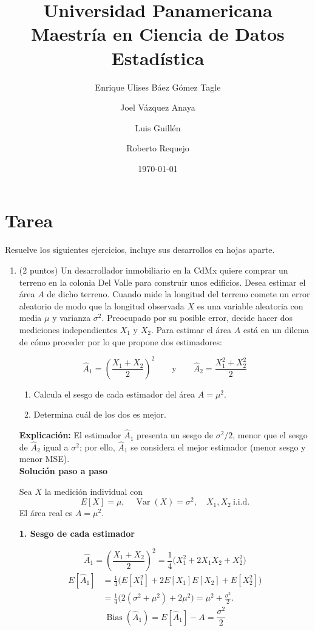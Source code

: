 \documentclass[12pt]{article}
\title{Universidad Panamericana \\ Maestría en Ciencia de Datos \\ Estadística}
\date{\today}
\author{Enrique Ulises Báez Gómez Tagle \and Joel Vázquez Anaya \and Luis Guillén \and Roberto Requejo}
\begin{document}
\maketitle

\section*{Tarea}

Resuelve los siguientes ejercicios, incluye sus desarrollos en hojas aparte.

\begin{enumerate}
	\item (2 puntos) Un desarrollador inmobiliario en la CdMx quiere comprar un terreno en la colonia Del Valle para construir unos edificios. Desea estimar el área $A$ de dicho terreno. Cuando mide la longitud del terreno comete un error aleatorio de modo que la longitud observada $X$ es una variable aleatoria con media $\mu$ y varianza $\sigma^2$. Preocupado por su posible error, decide hacer dos mediciones independientes $X_1$ y $X_2$. Para estimar el área $A$ está en un dilema de cómo proceder por lo que propone dos estimadores:

	      \[
		      \hat{A}_1 = \left( \frac{X_1 + X_2}{2} \right)^2 \qquad \text{y} \qquad \hat{A}_2 = \frac{X_1^2 + X_2^2}{2}
	      \]

	      \begin{enumerate}
		      \item Calcula el sesgo de cada estimador del área $A = \mu^2$.
		      \item Determina cuál de los dos es mejor.
	      \end{enumerate}
	      \textbf{Explicación:} El estimador \(\hat{A}_1\) presenta un sesgo de \(\sigma^2/2\), menor que el sesgo de \(\hat{A}_2\) igual a \(\sigma^2\); por ello, \(\hat{A}_1\) se considera el mejor estimador (menor sesgo y menor MSE).
\\[1em]
\textbf{Solución paso a paso}

Sea \(X\) la medición individual con
\[
E[X]=\mu,\quad \operatorname{Var}(X)=\sigma^{2},\quad X_1,X_2\ \text{i.i.d.}
\]
El área real es \(A=\mu^{2}\).

\medskip
\textbf{1. Sesgo de cada estimador}

\[
\hat A_{1}= \left(\frac{X_{1}+X_{2}}{2}\right)^{2}
= \frac{1}{4}\bigl(X_{1}^{2}+2X_{1}X_{2}+X_{2}^{2}\bigr)
\]
\begin{align*}
E[\hat A_{1}]
&=\frac{1}{4}\bigl(E[X_{1}^{2}]+2E[X_{1}]E[X_{2}]+E[X_{2}^{2}]\bigr)\\
&=\frac{1}{4}\bigl(2(\sigma^{2}+\mu^{2})+2\mu^{2}\bigr)
=\mu^{2}+\frac{\sigma^{2}}{2}.
\end{align*}
\[
\boxed{\operatorname{Bias}(\hat A_{1})=E[\hat A_{1}]-A=\frac{\sigma^{2}}{2}}
\]


\end{enumerate}
\end{document}

